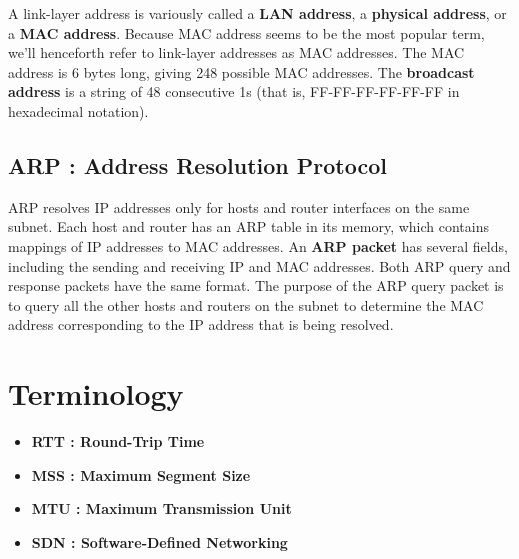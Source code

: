 \documentclass[11pt]{article}
\begin{document}
A link-layer address is variously called a \textbf{LAN address}, a \textbf{physical address}, or a \textbf{MAC address}. Because MAC address seems to be the most popular term, we’ll henceforth refer to link-layer addresses as MAC addresses. The MAC address is 6 bytes long, giving 248 possible MAC addresses. The \textbf{broadcast address} is a string of 48 consecutive 1s (that is, FF-FF-FF-FF-FF-FF in hexadecimal notation).

\subsection{ARP : Address Resolution Protocol}

ARP resolves IP addresses only for hosts and router interfaces on the same subnet. Each host and router has an ARP table in its memory, which contains mappings of IP addresses to MAC addresses. An \textbf{ARP packet} has several fields, including the sending and receiving IP and MAC addresses. Both ARP query and response packets have the same format. The purpose of the ARP query packet is to query all the other hosts and routers on the subnet to determine the MAC address corresponding to the IP address that is being resolved.

\section{Terminology}

\begin{itemize}

	\item \textbf{RTT : Round-Trip Time}
	
	\item \textbf{MSS : Maximum Segment Size}
	
	\item \textbf{MTU : Maximum Transmission Unit}
	
	\item \textbf{SDN : Software-Defined Networking}

\end{itemize}
\end{document}

